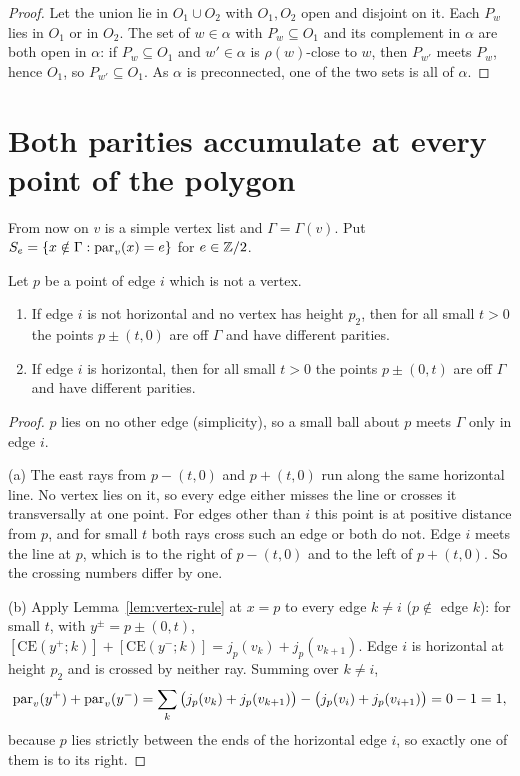 \begin{proof}
Let the union lie in $O_1\cup O_2$ with $O_1,O_2$ open and disjoint on it. Each $P_w$ lies in $O_1$ or
in $O_2$. The set of $w\in\alpha$ with $P_w\subseteq O_1$ and its complement in $\alpha$ are both open
in $\alpha$: if $P_w\subseteq O_1$ and $w'\in\alpha$ is $\rho(w)$-close to $w$, then $P_{w'}$ meets
$P_w$, hence $O_1$, so $P_{w'}\subseteq O_1$. As $\alpha$ is preconnected, one of the two sets is all
of $\alpha$.
\end{proof}


\section{Both parities accumulate at every point of the polygon}

From now on $v$ is a simple vertex list and $\Gamma=\Gamma(v)$. Put
$S_e=\left\{ x\notin\Gamma:\operatorname{par}_v(x)=e \right\}$ for $e\in\mathbb{Z}/2$.

\begin{lemma}[Flips]\label{lem:flip}
Let $p$ be a point of edge $i$ which is not a vertex.
\begin{enumerate}[label=(\alph*)]
\item If edge $i$ is not horizontal and no vertex has height $p_2$, then for all small $t>0$ the
points $p\pm(t,0)$ are off $\Gamma$ and have different parities.
\item If edge $i$ is horizontal, then for all small $t>0$ the points $p\pm(0,t)$ are off $\Gamma$ and
have different parities.
\end{enumerate}
\end{lemma}

\begin{proof}
$p$ lies on no other edge (simplicity), so a small ball about $p$ meets $\Gamma$ only in edge $i$.

(a) The east rays from $p-(t,0)$ and $p+(t,0)$ run along the same horizontal line. No vertex lies on
it, so every edge either misses the line or crosses it transversally at one point. For edges other
than $i$ this point is at positive distance from $p$, and for small $t$ both rays cross such an
edge or both do not. Edge $i$ meets the line at $p$, which is to the right of $p-(t,0)$ and to the
left of $p+(t,0)$. So the crossing numbers differ by one.

(b) Apply Lemma~\ref{lem:vertex-rule} at $x=p$ to every edge $k\neq i$ ($p\notin$ edge $k$): for small
$t$, with $y^\pm=p\pm(0,t)$,
$[\mathrm{CE}(y^+;k)]+[\mathrm{CE}(y^-;k)]=j_p(v_k)+j_p(v_{k+1})$. Edge $i$ is horizontal at height
$p_2$ and is crossed by neither ray. Summing over $k\neq i$,
\[
\operatorname{par}_v(y^+)+\operatorname{par}_v(y^-)=\sum_{k}\big(j_p(v_k)+j_p(v_{k+1})\big)-\big(j_p(v_i)+j_p(v_{i+1})\big)
=0-1=1,
\]
because $p$ lies strictly between the ends of the horizontal edge $i$, so exactly one of them is to
its right.
\end{proof}

